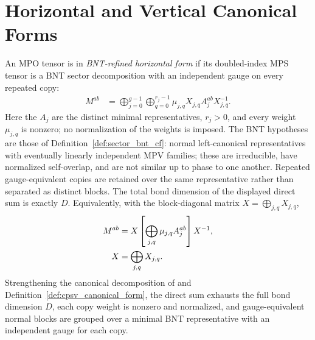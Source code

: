 \section{Horizontal and Vertical Canonical Forms}


\begin{definition}
    \label{def:horizontal_cf_mpdo}
    \leanok
    An MPO tensor is in \emph{BNT-refined horizontal form} if its
    doubled-index MPS tensor is a BNT sector decomposition with an independent
    gauge on every repeated copy:
    \begin{align}
        M^{ab}
         & =\bigoplus_{j=0}^{g-1}\bigoplus_{q=0}^{r_j-1}
        \mu_{j,q}X_{j,q}A_j^{ab}X_{j,q}^{-1}.
        \label{eq:mpdo_horizontal_cf}
    \end{align}
    Here the $A_j$ are the distinct minimal representatives, $r_j>0$, and
    every weight $\mu_{j,q}$ is nonzero; no normalization of the weights is
    imposed. The BNT hypotheses are those of
    Definition~\ref{def:sector_bnt_cf}: normal left-canonical
    representatives with eventually linearly independent MPV families; these
    are irreducible, have normalized self-overlap, and are not similar up to
    phase to one another.
    Repeated gauge-equivalent copies are retained over the same representative
    rather than separated as distinct blocks. The total bond dimension of
    the displayed direct sum is exactly $D$. Equivalently, with the
    block-diagonal matrix $X=\bigoplus_{j,q}X_{j,q}$,
    \begin{align}
        M^{ab}
         & =X\left[\bigoplus_{j,q}\mu_{j,q}A_j^{ab}\right]X^{-1},
        \notag                                                    \\
        X
         & =\bigoplus_{j,q}X_{j,q}.
        \notag
    \end{align}
    Strengthening the canonical decomposition of
    \cite[Section~2.3]{Cirac2016MPDO_arXiv} and
    Definition~\ref{def:cpsv_canonical_form}, the direct sum exhausts
    the full bond dimension $D$, each copy weight is nonzero and normalized, and
    gauge-equivalent normal blocks are grouped over a minimal BNT representative
    with an independent gauge for each copy.
\end{definition}

